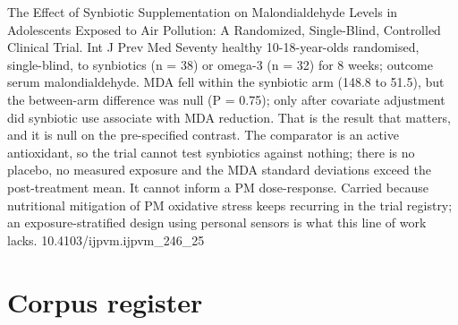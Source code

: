\documentclass[10pt]{article}
\begin{document}
{The Effect of Synbiotic Supplementation on Malondialdehyde Levels in Adolescents Exposed to Air Pollution: A Randomized, Single-Blind, Controlled Clinical Trial.}
{Int J Prev Med}
{Seventy healthy 10-18-year-olds randomised, single-blind, to synbiotics (n = 38) or omega-3 (n = 32) for 8 weeks; outcome serum malondialdehyde. MDA fell within the synbiotic arm (148.8 to 51.5), but the between-arm difference was null (P = 0.75); only after covariate adjustment did synbiotic use associate with MDA reduction. That is the result that matters, and it is null on the pre-specified contrast. The comparator is an active antioxidant, so the trial cannot test synbiotics against nothing; there is no placebo, no measured exposure and the MDA standard deviations exceed the post-treatment mean. It cannot inform a PM dose-response. Carried because nutritional mitigation of PM oxidative stress keeps recurring in the trial registry; an exposure-stratified design using personal sensors is what this line of work lacks.}
{10.4103/ijpvm.ijpvm_246_25}
\section*{\sffamily\bfseries\color{Deep}Corpus register}
\vspace{-1.5mm}{\color{Amber}\rule{\linewidth}{1.1pt}}\vspace{2.5mm}


\end{document}
